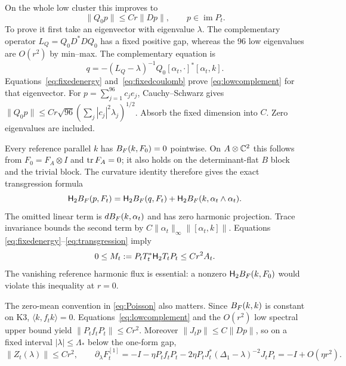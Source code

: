 On the whole low cluster this improves to
\begin{equation}\label{eq:lowcomplement}
 \|Q_0p\|\le Cr\|Dp\|,\qquad p\in\operatorname{im}P_t.
\end{equation}
To prove it first take an eigenvector with eigenvalue $\lambda$.
The complementary operator $L_Q=Q_0D^*DQ_0$ has a fixed positive
gap, whereas the 96 low eigenvalues are $O(r^2)$ by min--max.
The complementary equation is
\[
 q=-(L_Q-\lambda)^{-1}Q_0
       [\alpha_t,\cdot]^*[\alpha_t,k].
\]
Equations~\eqref{eq:fixedenergy} and~\eqref{eq:fixedcoulomb}
prove \eqref{eq:lowcomplement} for that eigenvector. For
$p=\sum_{j=1}^{96}c_je_j$, Cauchy--Schwarz gives
$\|Q_0p\|\le Cr\sqrt{96}(\sum_j|c_j|^2\lambda_j)^{1/2}$.
Absorb the fixed dimension into $C$. Zero eigenvalues are included.

Every reference parallel $k$ has $B_F(k,F_0)=0$ pointwise.
On $A\otimes\mathbb C^2$ this follows from
$F_0=F_A\otimes I$ and $\operatorname{tr} F_A=0$; it also holds on the
determinant-flat $B$ block and the trivial block. The curvature
identity therefore gives the exact transgression formula
\begin{equation}\label{eq:transgression}
 \mathsf H_2B_F(p,F_t)=\mathsf H_2B_F(q,F_t)
                    +\mathsf H_2B_F(k,\alpha_t\wedge\alpha_t).
\end{equation}
The omitted linear term is $dB_F(k,\alpha_t)$ and has zero
harmonic projection. Trace invariance bounds the second term by
$C\|\alpha_t\|_\infty\|[\alpha_t,k]\|$. Equations
\eqref{eq:fixedenergy}--\eqref{eq:transgression} imply
\begin{equation}\label{eq:relativeharmonic}
 0\le M_t:=P_tT_t^*\mathsf H_2T_tP_t\le Cr^2A_t.
\end{equation}
The vanishing reference harmonic flux is essential: a nonzero
$\mathsf H_2B_F(k,F_0)$ would violate this inequality at $r=0$.

The zero-mean convention in \eqref{eq:Poisson} also matters.
Since $B_F(k,k)$ is constant on K3, $\langle k,f_tk\rangle=0$.
Equations~\eqref{eq:lowcomplement} and the $O(r^2)$ low
spectral upper bound yield $\|P_tf_tP_t\|\le Cr^2$.
Moreover $\|J_tp\|\le C\|Dp\|$, so on a fixed interval
$|\lambda|\le\Lambda_*$ below the one-form gap,
\begin{equation}\label{eq:relativekinetic}
 \|Z_t(\lambda)\|\le Cr^2,\qquad
 \partial_\lambda F_t^{[1]}
 =-I-\eta P_tf_tP_t
 -2\eta P_tJ_t^*(\Delta_1-\lambda)^{-2}J_tP_t
 =-I+O(\eta r^2).
\end{equation}


